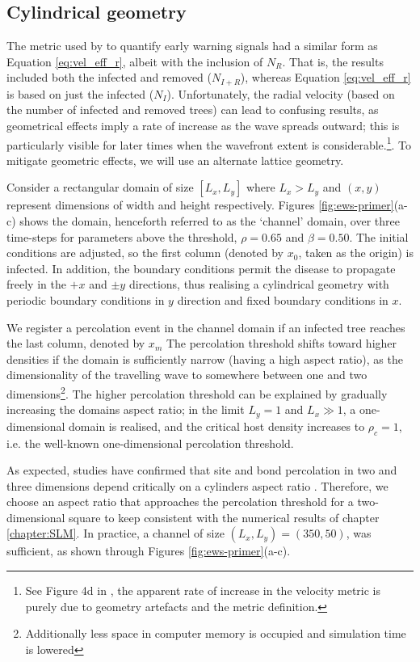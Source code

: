 \subsection{Cylindrical geometry}

The metric used by \cite{OROZCOFUENTES201912} to quantify early warning signals had a similar form as Equation \ref{eq:vel_eff_r}, albeit with the inclusion of $N_R$.
That is, the results included both the infected and removed ($N_{I+R}$), whereas Equation \ref{eq:vel_eff_r} is based on just the infected ($N_I$). 
Unfortunately, the radial velocity (based on the number of infected and removed trees) can lead to confusing results, as geometrical effects imply a rate of increase as the wave spreads outward; this is particularly visible for later times when the wavefront extent is considerable.\footnote{See Figure 4d in \cite{OROZCOFUENTES201912}, the apparent rate of increase in the velocity metric is purely due to geometry artefacts and the metric definition.}.
To mitigate geometric effects, we will use an alternate lattice geometry.

Consider a rectangular domain of size $[L_x, L_y]$ where $L_x>L_y$ and $(x, y)$ represent dimensions of width and height respectively.
Figures \ref{fig:ews-primer}(a-c) shows the domain, henceforth referred to as the `channel' domain, over three time-steps for parameters above the threshold, $\rho=0.65$ and $\beta=0.50$.
The initial conditions are adjusted, so the first column (denoted by $x_0$, taken as the origin) is infected.
In addition, the boundary conditions permit the disease to propagate freely in the $+x$ and $\pm y$ directions, thus realising a cylindrical geometry with periodic boundary conditions in $y$ direction and fixed boundary conditions in $x$.

We register a percolation event in the channel domain if an infected tree reaches the last column, denoted by $x_m$
The percolation threshold shifts toward higher densities if the domain is sufficiently narrow (having a high aspect ratio), as the dimensionality of the travelling wave to somewhere between one and two dimensions\footnote{Additionally less space in computer memory is occupied and simulation time is lowered}. 
The higher percolation threshold can be explained by gradually increasing the domains aspect ratio;
in the limit $L_y = 1$ and $L_x  \gg 1$, a one-dimensional domain is realised, and the critical host density increases to $\rho_c=1$, i.e. the well-known one-dimensional percolation threshold.

As expected, studies have confirmed that site and bond percolation in two and three dimensions depend critically on a cylinders aspect ratio \cite{sangare2009continuum}.
Therefore, we choose an aspect ratio that approaches the percolation threshold for a two-dimensional square to keep consistent with the numerical results of chapter \ref{chapter:SLM}. 
In practice, a channel of size $(L_x, L_y) = (350, 50)$, was sufficient, as shown through Figures \ref{fig:ews-primer}(a-c). 

